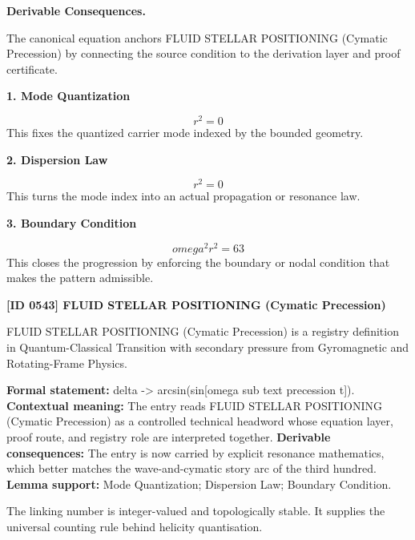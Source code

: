 \par\vspace{0.35em}
\noindent\textbf{Derivable Consequences.}\quad
\begingroup
\footnotesize
\raggedright
The canonical equation anchors FLUID STELLAR POSITIONING (Cymatic Precession) by connecting the source condition to the derivation layer and proof certificate.
\par\endgroup

\noindent\textbf{1. Mode Quantization}\par
\[
r^2 = 0
\]
\noindent This fixes the quantized carrier mode indexed by the bounded geometry.\par
\noindent\textbf{2. Dispersion Law}\par
\[
r^2 = 0
\]
\noindent This turns the mode index into an actual propagation or resonance law.\par
\noindent\textbf{3. Boundary Condition}\par
\[
omega^2 r^2 = 63
\]
\noindent This closes the progression by enforcing the boundary or nodal condition that makes the pattern admissible.\par

\clearpage
\noindent\textbf{[ID 0543] FLUID STELLAR POSITIONING (Cymatic Precession)}\par
\vspace{0.35em}
\begingroup\small
{}
FLUID STELLAR POSITIONING (Cymatic Precession) is a registry definition in Quantum-Classical Transition with secondary pressure from Gyromagnetic and Rotating-Frame Physics.

\begingroup\footnotesize\setlength{\emergencystretch}{3em}\sloppy
\textbf{Formal statement:} delta -> arcsin(sin[omega sub text precession t]). \textbf{Contextual meaning:} The entry reads FLUID STELLAR POSITIONING (Cymatic Precession) as a controlled technical headword whose equation layer, proof route, and registry role are interpreted together. \textbf{Derivable consequences:} The entry is now carried by explicit resonance mathematics, which better matches the wave-and-cymatic story arc of the third hundred. \textbf{Lemma support:} Mode Quantization; Dispersion Law; Boundary Condition.\par
\endgroup

The linking number is integer-valued and topologically stable. It supplies the universal counting rule behind helicity quantisation.

